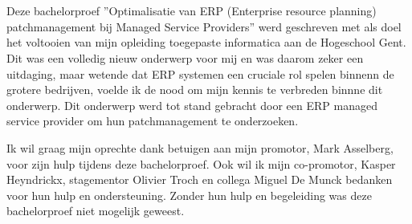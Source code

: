 
\chapter*{}%
\label{ch:voorwoord}



Deze bachelorproef ”Optimalisatie van ERP (Enterprise resource planning)
patchmanagement bij Managed Service Providers” werd geschreven met
als doel het voltooien van mijn opleiding toegepaste informatica aan de Hogeschool Gent.
Dit was een volledig nieuw onderwerp voor mij en was daarom zeker een uitdaging, maar wetende dat ERP systemen een cruciale rol spelen binnenn de grotere bedrijven, voelde ik de nood om mijn kennis te verbreden binnne dit onderwerp. Dit onderwerp werd tot stand gebracht door een ERP managed service provider om hun patchmanagement te onderzoeken.

Ik wil graag mijn oprechte dank betuigen aan mijn promotor, Mark Asselberg, voor zijn hulp tijdens deze bachelorproef. Ook wil ik mijn co-promotor, Kasper Heyndrickx, stagementor Olivier Troch en collega Miguel De Munck bedanken voor hun hulp en ondersteuning. Zonder hun hulp en begeleiding was deze bachelorproef niet mogelijk geweest.